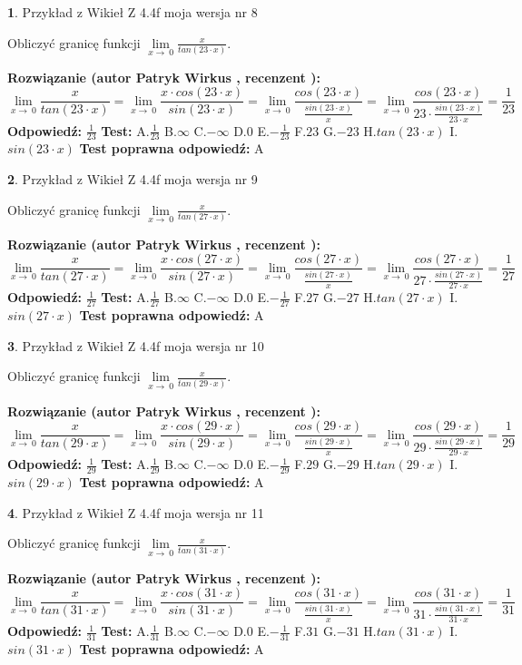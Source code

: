 \documentclass[12pt, a4paper]{article}
\theoremstyle{definition} %
\newtheorem{zad}{}
\newcommand{\zadStart}[1]{\begin{zad}#1\newline}
\newcommand{\zadStop}{\end{zad}}
\newcommand{\rozwStart}[2]{\noindent \textbf{Rozwiązanie (autor #1 , recenzent #2): }\newline}
\newcommand{\rozwStop}{\newline}
\newcommand{\odpStart}{\noindent \textbf{Odpowiedź:}\newline}
\newcommand{\odpStop}{\newline}
\newcommand{\testStart}{\noindent \textbf{Test:}\newline}
\newcommand{\testStop}{\newline}
\newcommand{\kluczStart}{\noindent \textbf{Test poprawna odpowiedź:}\newline}
\newcommand{\kluczStop}{\newline}
\begin{document}
\zadStart{Przykład z Wikieł Z 4.4f moja wersja nr 8}


Obliczyć granicę funkcji $\lim\limits_{x\to\ 0}\frac{x}{tan(23 \cdot x)}$.
\zadStop
\rozwStart{Patryk Wirkus}{}
$$\lim\limits_{x\to\ 0}\frac{x}{tan(23 \cdot x)}=\lim\limits_{x\to\ 0}\frac{x \cdot cos(23 \cdot x)}{sin(23 \cdot x)}=\lim\limits_{x\to\ 0}\frac{cos(23 \cdot x)}{\frac{sin(23 \cdot x)}{x}}=\lim\limits_{x\to\ 0}\frac{cos(23 \cdot x)}{23 \cdot \frac{sin(23 \cdot x)}{23 \cdot x}} = \frac{1}{23}$$
\rozwStop
\odpStart
$\frac{1}{23}$
\odpStop
\testStart
A.$\frac{1}{23}$
B.$\infty$
C.$-\infty$
D.$0$
E.$-\frac{1}{23}$
F.$23$
G.$-23$
H.$tan(23 \cdot x)$
I.$sin(23 \cdot x)$
\testStop
\kluczStart
A
\kluczStop



\zadStart{Przykład z Wikieł Z 4.4f moja wersja nr 9}


Obliczyć granicę funkcji $\lim\limits_{x\to\ 0}\frac{x}{tan(27 \cdot x)}$.
\zadStop
\rozwStart{Patryk Wirkus}{}
$$\lim\limits_{x\to\ 0}\frac{x}{tan(27 \cdot x)}=\lim\limits_{x\to\ 0}\frac{x \cdot cos(27 \cdot x)}{sin(27 \cdot x)}=\lim\limits_{x\to\ 0}\frac{cos(27 \cdot x)}{\frac{sin(27 \cdot x)}{x}}=\lim\limits_{x\to\ 0}\frac{cos(27 \cdot x)}{27 \cdot \frac{sin(27 \cdot x)}{27 \cdot x}} = \frac{1}{27}$$
\rozwStop
\odpStart
$\frac{1}{27}$
\odpStop
\testStart
A.$\frac{1}{27}$
B.$\infty$
C.$-\infty$
D.$0$
E.$-\frac{1}{27}$
F.$27$
G.$-27$
H.$tan(27 \cdot x)$
I.$sin(27 \cdot x)$
\testStop
\kluczStart
A
\kluczStop



\zadStart{Przykład z Wikieł Z 4.4f moja wersja nr 10}


Obliczyć granicę funkcji $\lim\limits_{x\to\ 0}\frac{x}{tan(29 \cdot x)}$.
\zadStop
\rozwStart{Patryk Wirkus}{}
$$\lim\limits_{x\to\ 0}\frac{x}{tan(29 \cdot x)}=\lim\limits_{x\to\ 0}\frac{x \cdot cos(29 \cdot x)}{sin(29 \cdot x)}=\lim\limits_{x\to\ 0}\frac{cos(29 \cdot x)}{\frac{sin(29 \cdot x)}{x}}=\lim\limits_{x\to\ 0}\frac{cos(29 \cdot x)}{29 \cdot \frac{sin(29 \cdot x)}{29 \cdot x}} = \frac{1}{29}$$
\rozwStop
\odpStart
$\frac{1}{29}$
\odpStop
\testStart
A.$\frac{1}{29}$
B.$\infty$
C.$-\infty$
D.$0$
E.$-\frac{1}{29}$
F.$29$
G.$-29$
H.$tan(29 \cdot x)$
I.$sin(29 \cdot x)$
\testStop
\kluczStart
A
\kluczStop



\zadStart{Przykład z Wikieł Z 4.4f moja wersja nr 11}


Obliczyć granicę funkcji $\lim\limits_{x\to\ 0}\frac{x}{tan(31 \cdot x)}$.
\zadStop
\rozwStart{Patryk Wirkus}{}
$$\lim\limits_{x\to\ 0}\frac{x}{tan(31 \cdot x)}=\lim\limits_{x\to\ 0}\frac{x \cdot cos(31 \cdot x)}{sin(31 \cdot x)}=\lim\limits_{x\to\ 0}\frac{cos(31 \cdot x)}{\frac{sin(31 \cdot x)}{x}}=\lim\limits_{x\to\ 0}\frac{cos(31 \cdot x)}{31 \cdot \frac{sin(31 \cdot x)}{31 \cdot x}} = \frac{1}{31}$$
\rozwStop
\odpStart
$\frac{1}{31}$
\odpStop
\testStart
A.$\frac{1}{31}$
B.$\infty$
C.$-\infty$
D.$0$
E.$-\frac{1}{31}$
F.$31$
G.$-31$
H.$tan(31 \cdot x)$
I.$sin(31 \cdot x)$
\testStop
\kluczStart
A
\kluczStop
\end{document}
